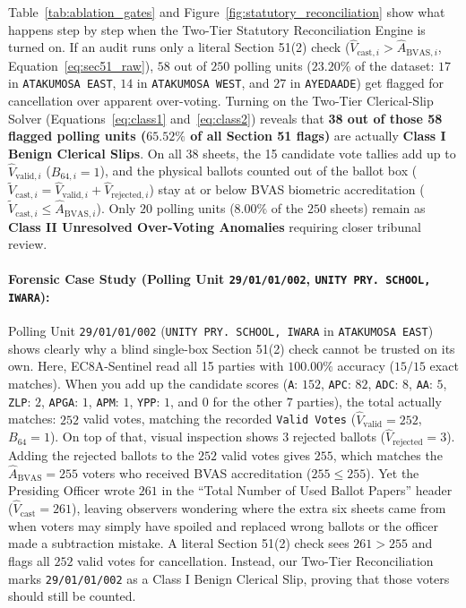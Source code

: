 \documentclass{article}
\begin{document}
Table~\ref{tab:ablation_gates} and Figure~\ref{fig:statutory_reconciliation} show what happens step by step when the Two-Tier Statutory Reconciliation Engine is turned on. If an audit runs only a literal Section 51(2) check ($\hat{V}_{\text{cast}, i} > \hat{A}_{\text{BVAS}, i}$, Equation~\ref{eq:sec51_raw}), $58$ out of $250$ polling units ($23.20\%$ of the dataset: $17$ in \texttt{ATAKUMOSA EAST}, $14$ in \texttt{ATAKUMOSA WEST}, and $27$ in \texttt{AYEDAADE}) get flagged for cancellation over apparent over-voting. Turning on the Two-Tier Clerical-Slip Solver (Equations~\ref{eq:class1} and~\ref{eq:class2}) reveals that \textbf{38 out of those 58 flagged polling units ($65.52\%$ of all Section 51 flags)} are actually \textbf{Class I Benign Clerical Slips}. On all 38 sheets, the 15 candidate vote tallies add up to $\hat{V}_{\text{valid}, i}$ ($B_{64, i} = 1$), and the physical ballots counted out of the ballot box ($\tilde{V}_{\text{cast}, i} = \hat{V}_{\text{valid}, i} + \hat{V}_{\text{rejected}, i}$) stay at or below BVAS biometric accreditation ($\tilde{V}_{\text{cast}, i} \le \hat{A}_{\text{BVAS}, i}$). Only $20$ polling units ($8.00\%$ of the $250$ sheets) remain as \textbf{Class II Unresolved Over-Voting Anomalies} requiring closer tribunal review.

\paragraph{Forensic Case Study (Polling Unit \texttt{29/01/01/002}, \texttt{UNITY PRY. SCHOOL, IWARA}):}
Polling Unit \texttt{29/01/01/002} (\texttt{UNITY PRY. SCHOOL, IWARA} in \texttt{ATAKUMOSA EAST}) shows clearly why a blind single-box Section 51(2) check cannot be trusted on its own. Here, EC8A-Sentinel read all 15 parties with $100.00\%$ accuracy ($15/15$ exact matches). When you add up the candidate scores (\texttt{A}: $152$, \texttt{APC}: $82$, \texttt{ADC}: $8$, \texttt{AA}: $5$, \texttt{ZLP}: $2$, \texttt{APGA}: $1$, \texttt{APM}: $1$, \texttt{YPP}: $1$, and $0$ for the other $7$ parties), the total actually matches: $252$ valid votes, matching the recorded \texttt{Valid Votes} ($\hat{V}_{\text{valid}} = 252$, $B_{64} = 1$). On top of that, visual inspection shows $3$ rejected ballots ($\hat{V}_{\text{rejected}} = 3$). Adding the rejected ballots to the $252$ valid votes gives $255$, which matches the $\hat{A}_{\text{BVAS}} = 255$ voters who received BVAS accreditation ($255 \le 255$). Yet the Presiding Officer wrote $261$ in the ``Total Number of Used Ballot Papers'' header ($\hat{V}_{\text{cast}} = 261$), leaving observers wondering where the extra six sheets came from when voters may simply have spoiled and replaced wrong ballots or the officer made a subtraction mistake. A literal Section 51(2) check sees $261 > 255$ and flags all $252$ valid votes for cancellation. Instead, our Two-Tier Reconciliation marks \texttt{29/01/01/002} as a Class I Benign Clerical Slip, proving that those voters should still be counted.
\end{document}
